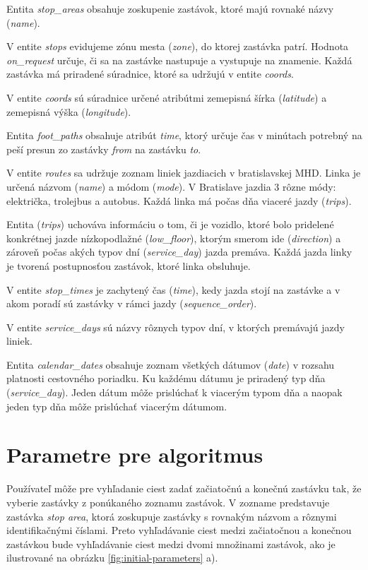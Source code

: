 Entita \textit{stop\_areas} obsahuje zoskupenie zastávok, ktoré majú rovnaké názvy (\textit{name}). 


V entite \textit{stops} evidujeme zónu mesta (\textit{zone}), do ktorej zastávka patrí. Hodnota \textit{on\_request} určuje, či sa na  zastávke nastupuje a vystupuje na znamenie. Každá zastávka má priradené súradnice, ktoré sa udržujú v entite \textit{coords}.

V entite \textit{coords} sú súradnice určené atribútmi zemepisná šírka (\textit{latitude}) a zemepisná výška (\textit{longitude}). 

Entita \textit{foot\_paths} obsahuje atribút \textit{time}, ktorý určuje čas v minútach potrebný na peší presun zo zastávky \textit{from} na zastávku \textit{to}.

V entite \textit{routes} sa udržuje zoznam liniek jazdiacich v bratislavskej MHD. Linka je určená názvom (\textit{name}) a módom (\textit{mode}). V Bratislave jazdia 3 rôzne módy: električka, trolejbus a autobus. Každá linka má počas dňa viaceré jazdy (\textit{trips}).

Entita (\textit{trips}) uchováva informáciu o tom, či je vozidlo, ktoré bolo pridelené konkrétnej jazde nízkopodlažné (\textit{low\_floor}), ktorým smerom ide (\textit{direction}) a zároveň počas akých typov dní (\textit{service\_day}) jazda premáva. Každá jazda linky je tvorená postupnosťou zastávok, ktoré linka obsluhuje.

V entite \textit{stop\_times} je zachytený čas (\textit{time}), kedy jazda stojí na zastávke a v akom poradí sú zastávky v rámci jazdy (\textit{sequence\_order}).

V entite \textit{service\_days} sú názvy rôznych typov dní, v ktorých premávajú jazdy liniek. 

Entita \textit{calendar\_dates} obsahuje zoznam všetkých dátumov (\textit{date}) v rozsahu platnosti cestovného poriadku. Ku každému dátumu je priradený typ dňa (\textit{service\_day}). Jeden dátum môže prislúchať k viacerým typom dňa a naopak jeden typ dňa môže prislúchať viacerým dátumom.


\section{Parametre pre algoritmus}
Používateľ môže pre vyhľadanie ciest zadať začiatočnú a konečnú zastávku tak, že vyberie zastávky z ponúkaného zoznamu zastávok. V zozname predstavuje zastávka \textit{stop area}, ktorá zoskupuje zastávky s rovnakým názvom a rôznymi identifikačnými číslami. Preto vyhľadávanie ciest medzi začiatočnou a konečnou zastávkou bude vyhľadávanie ciest medzi  dvomi množinami zastávok, ako je ilustrované na obrázku \ref{fig:initial-parameters} a).

